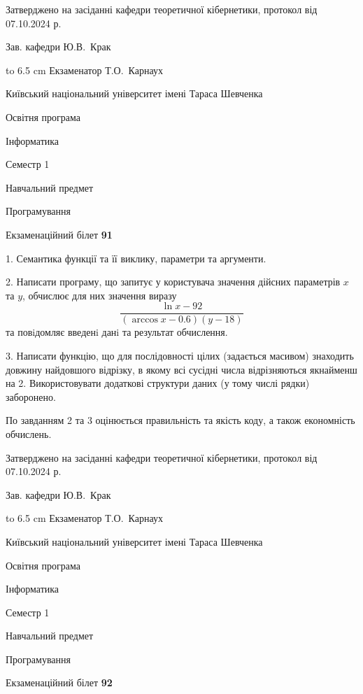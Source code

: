 \documentclass[12pt, ukrainian]{article}
\begin{document}
{\smallskip\smallskip \begin {scriptsize} Затверджено на засіданні кафедри теоретичної кібернетики, протокол   від   07.10.2024 р.\par\smallskip\smallskip\smallskip\smallskip
{\parbox {6.5 cm} {Зав. кафедри \dotfill Ю.В.~Крак}}\hspace {0.7cm} {\hbox to 6.5 cm { Екзаменатор \dotfill Т.О.~Карнаух}} \end{scriptsize}}
\newpage
{{\begin {scriptsize}\par
{ \center  Київський національний університет імені Тараса Шевченка \par}
{\parbox {5 cm}{Освітня програма \hfill}{\parbox {7 cm}{Інформатика\hfill}}\parbox {6 cm}{\hfill Семестр 1}}\par
{\parbox {5 cm} {Навчальний предмет \hfill}\parbox {7 cm}{Програмування \hfill}\parbox {6cm}{\hfill}\par}\vspace{-15pt} \end{scriptsize}}{\center Екзаменаційний білет \No \textbf { 91 }\par}}
{%
1. Семантика функції та її виклику, параметри та аргументи.%
\par
2. Написати програму, що запитує у користувача значення дійсних параметрів $x$ та $y$, обчислює для них значення виразу 
$$\frac{\ln x - 92}{(\arccos x - 0.6) (y - 18)}$$ 
та повiдомляє введенi данi та результат обчислення.

\par
3. Написати функцію, що для послідовності цілих (задається масивом) знаходить довжину найдовшого відрізку, в якому всі сусідні числа відрізняються якнайменш на 2. Використовувати додаткові структури даних (у тому числі рядки) заборонено.

По завданням 2 та 3 оцінюється правильність та якість коду, а також економність обчислень.

}
{\smallskip\smallskip \begin {scriptsize} Затверджено на засіданні кафедри теоретичної кібернетики, протокол   від   07.10.2024 р.\par\smallskip\smallskip\smallskip\smallskip
{\parbox {6.5 cm} {Зав. кафедри \dotfill Ю.В.~Крак}}\hspace {0.7cm} {\hbox to 6.5 cm { Екзаменатор \dotfill Т.О.~Карнаух}} \end{scriptsize}}
\vspace{0.9cm}
{{\begin {scriptsize}\par
{ \center  Київський національний університет імені Тараса Шевченка \par}
{\parbox {5 cm}{Освітня програма \hfill}{\parbox {7 cm}{Інформатика\hfill}}\parbox {6 cm}{\hfill Семестр 1}}\par
{\parbox {5 cm} {Навчальний предмет \hfill}\parbox {7 cm}{Програмування \hfill}\parbox {6cm}{\hfill}\par}\vspace{-15pt} \end{scriptsize}}{\center Екзаменаційний білет \No \textbf { 92 }\par}}
\end{document}
